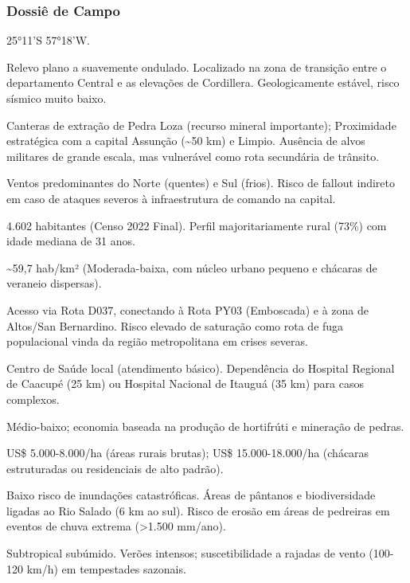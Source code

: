 \subsubsection{Dossiê de Campo}
\begin{description}[style=nextline,leftmargin=0.5cm,font=\bfseries]
\item[Coordenadas]  25°11'S 57°18'W.
\item[Topografia]  Relevo plano a suavemente ondulado. Localizado na zona de transição entre o departamento Central e as elevações de Cordillera. Geologicamente estável, risco sísmico muito baixo.
\item[Alvos Estratégicos]  Canteras de extração de Pedra Loza (recurso mineral importante); Proximidade estratégica com a capital Assunção (\textasciitilde 50 km) e Limpio. Ausência de alvos militares de grande escala, mas vulnerável como rota secundária de trânsito.
\item[Fallout]  Ventos predominantes do Norte (quentes) e Sul (frios). Risco de fallout indireto em caso de ataques severos à infraestrutura de comando na capital.
\item[População]  4.602 habitantes (Censo 2022 Final). Perfil majoritariamente rural (73\%) com idade mediana de 31 anos.
\item[Densidade]  \textasciitilde 59,7 hab/\allowbreak km² (Moderada-baixa, com núcleo urbano pequeno e chácaras de veraneio dispersas).
\item[Vias de Acesso]  Acesso via Rota D037, conectando à Rota PY03 (Emboscada) e à zona de Altos/\allowbreak San Bernardino. Risco elevado de saturação como rota de fuga populacional vinda da região metropolitana em crises severas.
\item[Serviços]  Centro de Saúde local (atendimento básico). Dependência do Hospital Regional de Caacupé (25 km) ou Hospital Nacional de Itauguá (35 km) para casos complexos.
\item[Custo de Vida]  Médio-baixo; economia baseada na produção de hortifrúti e mineração de pedras.
\item[Preço da Terra]  US\$ 5.000-8.000/\allowbreak ha (áreas rurais brutas); US\$ 15.000-18.000/\allowbreak ha (chácaras estruturadas ou residenciais de alto padrão).
\item[Hidrologia]  Baixo risco de inundações catastróficas. Áreas de pântanos e biodiversidade ligadas ao Rio Salado (6 km ao sul). Risco de erosão em áreas de pedreiras em eventos de chuva extrema (>1.500 mm/\allowbreak ano).
\item[Clima]  Subtropical subúmido. Verões intensos; suscetibilidade a rajadas de vento (100-120 km/\allowbreak h) em tempestades sazonais.

\end{description}
